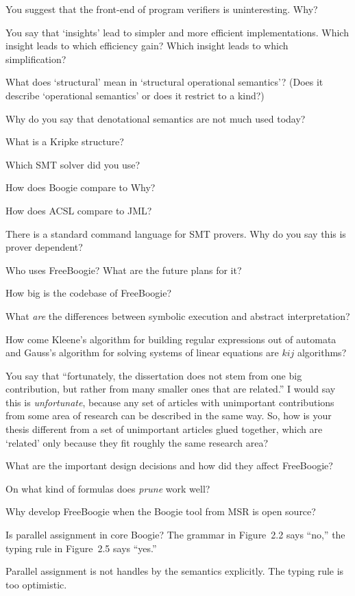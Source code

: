 \Q You suggest that the front-end of program verifiers is uninteresting.
Why?

\Q You say that `insights' lead to simpler and more efficient
implementations.  Which insight leads to which efficiency gain? Which
insight leads to which simplification?

\Q What does `structural' mean in `structural operational semantics'?
(Does it describe `operational semantics' or does it restrict to a kind?)

\Q Why do you say that denotational semantics are not much used today?

\Q What is a Kripke structure?

\Q Which SMT solver did you use?

\Q How does Boogie compare to Why?

\Q How does ACSL compare to JML?

\Q There is a standard command language for SMT provers. Why do you say
this is prover dependent?

\Q Who uses FreeBoogie? What are the future plans for it?

\Q How big is the codebase of FreeBoogie?

\Q What {\it are\/} the differences between symbolic execution and abstract
interpretation?

\Q How come Kleene's algorithm for building regular expressions out of
automata and Gauss's algorithm for solving systems of linear equations are
$kij$ algorithms?

\Q You say that ``fortunately, the dissertation does not stem from one big
contribution, but rather from many smaller ones that are related.'' I would
say this is {\it unfortunate}, because any set of articles with unimportant
contributions from some area of research can be described in the same way.
So, how is your thesis different from a set of unimportant articles glued
together, which are `related' only because they fit roughly the same
research area?

\Q What are the important design decisions and how did they affect
FreeBoogie?

\Q On what kind of formulas does {\it prune\/} work well?

\Q Why develop FreeBoogie when the Boogie tool from MSR is open source?

\Q Is parallel assignment in core Boogie? The grammar in Figure~2.2 says
``no,'' the typing rule in Figure~2.5 says ``yes.''

\A Parallel assignment is not handles by the semantics explicitly. The
typing rule is too optimistic.

